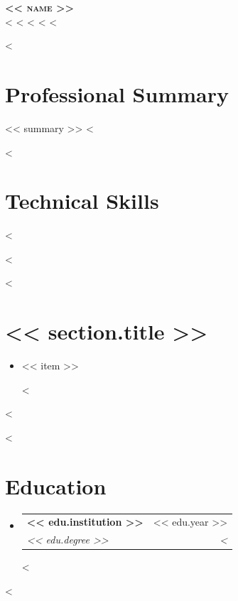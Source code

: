 \documentclass[letterpaper,11pt]{article}
\makeatletter
\newcommand{\resumeSubheading}[4]{
  \vspace{-2pt}\item
    \begin{tabular*}{0.97\textwidth}[t]{l@{\extracolsep{\fill}}r}
      \textbf{#1} & #2 \\
      \textit{\small#3} & \textit{\small #4} \\
    \end{tabular*}\vspace{-7pt}
}
\newcommand{\resumeItem}[1]{
  \item\small{#1 \vspace{-2pt}}
}
\newcommand{\resumeSubHeadingListStart}{\begin{itemize}[leftmargin=0.15in, label={}]}
\newcommand{\resumeSubHeadingListEnd}{\end{itemize}}
\makeatother
\begin{document}
\begin{center}
    \textbf{\Huge \scshape << name >>} \\ \vspace{1pt}
    \small
    <%
    <%
    <%
    <%
    <%
\end{center}

<%
\section{Professional Summary}
\small{<< summary >>}
<%

<%
\section{Technical Skills}
\begin{itemize}[leftmargin=0.15in, label={}]
    \small{\item{
        <%
    }}
\end{itemize}
<%

<%
\section{<< section.title >>}
\resumeSubHeadingListStart
    <%
    \resumeItem{<< item >>}
    <%
\resumeSubHeadingListEnd
<%

<%
\section{Education}
\resumeSubHeadingListStart
    <%
    \resumeSubheading
        {<< edu.institution >>}{<< edu.year >>}
        {<< edu.degree >>}<%
    <%
\resumeSubHeadingListEnd
<%
\end{document}
